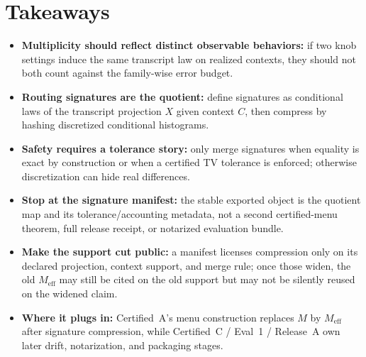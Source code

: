 \documentclass[11pt]{article}
\begin{document}
\section{Takeaways}
\begin{itemize}[leftmargin=*]
\item \textbf{Multiplicity should reflect distinct observable behaviors:} if two knob settings induce the same transcript law on realized contexts, they should not both count against the family-wise error budget.
\item \textbf{Routing signatures are the quotient:} define signatures as conditional laws of the transcript projection $X$ given context $C$, then compress by hashing discretized conditional histograms.
\item \textbf{Safety requires a tolerance story:} only merge signatures when equality is exact by construction or when a certified TV tolerance is enforced; otherwise discretization can hide real differences.
\item \textbf{Stop at the signature manifest:} the stable exported object is the quotient map and its tolerance/accounting metadata, not a second certified-menu theorem, full release receipt, or notarized evaluation bundle.
\item \textbf{Make the support cut public:} a manifest licenses compression only on its declared projection, context support, and merge rule; once those widen, the old $M_{\mathrm{eff}}$ may still be cited on the old support but may not be silently reused on the widened claim.
\item \textbf{Where it plugs in:} Certified~A's menu construction replaces $M$ by $M_{\mathrm{eff}}$ after signature compression, while Certified~C / Eval~1 / Release~A own later drift, notarization, and packaging stages.
\end{itemize}
\end{document}
